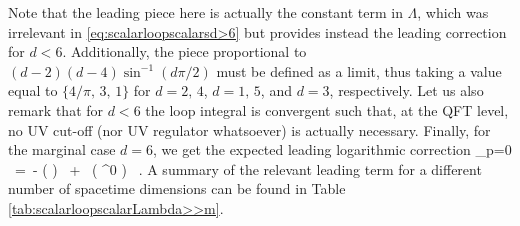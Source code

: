 %
Note that the leading piece here is actually the constant term in $\Lambda$, which was irrelevant in \eqref{eq:scalarloopscalarsd>6} but provides instead the leading correction for $d<6$. Additionally, the piece proportional to $(d-2)(d-4)\sin^{-1}\left( d \pi/2\right)$ must be defined as a limit, thus taking a value equal to $\{ 4/\pi,\, 3,\, 1\}$ for $d=2,\, 4$, $d=1,\, 5$, and $d=3$, respectively. Let us also remark that for $d<6$ the loop integral is convergent such that, at the QFT level, no UV cut-off (nor UV regulator whatsoever) is actually necessary. Finally, for the marginal case $d=6$, we get the expected leading logarithmic correction
%
\beq
		 \bigg\rvert_{p=0} \, =\, -  \log \left(  \right) \ + \ \left( \Lambda^0 \right)  \, .
\label{eq:scalarloopscalard=6}
\eeq
%
A summary of the relevant leading term for a different number of spacetime dimensions can be found in Table \ref{tab:scalarloopscalarLambda>>m}.
		

